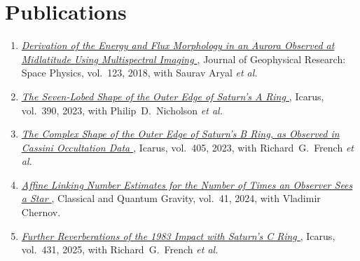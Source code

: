 \documentclass[letterpaper,sans]{moderncv}
\begin{document}
    \section{Publications}
        \begin{enumerate}\raggedright
            \item
                \textit{%
                    \href{https://doi.org/10.1029/2018JA025229}{%
                        Derivation of the Energy and Flux Morphology in an
                        Aurora Observed at Midlatitude Using Multispectral
                        Imaging%
                    }%
                },
                Journal of Geophysical Research: Space Physics,
                vol.~123, 2018, with Saurav Aryal \textit{et al.}
            \item
                \textit{%
                    \href{https://doi.org/10.1016/j.icarus.2022.115287}{%
                        The Seven-Lobed Shape of the Outer
                        Edge of Saturn's A Ring%
                    }%
                },
                Icarus, vol.~390, 2023, with Philip~D.~Nicholson
                \textit{et al.}
            \item
                \textit{%
                    \href{https://doi.org/10.1016/j.icarus.2023.115678}{%
                        The Complex Shape of the Outer Edge of Saturn's
                        B Ring, as Observed in Cassini Occultation Data%
                    }%
                },
                Icarus, vol.~405, 2023, with Richard~G.~French
                \textit{et al.}
            \item
                \textit{%
                    \href{https://doi.org/10.1088/1361-6382/ad2e41}{%
                        Affine Linking Number Estimates for the Number of
                        Times an Observer Sees a Star%
                    }%
                },
                Classical and Quantum Gravity, vol.~41, 2024,
                with Vladimir Chernov.
            \item
                \textit{%
                    \href{https://doi.org/10.1016/j.icarus.2025.116463}{%
                        Further Reverberations of the 1983
                        Impact with Saturn's C Ring%
                    }%
                },
                Icarus, vol.~431, 2025, with Richard~G.~French
                \textit{et al.}
        \end{enumerate}
\end{document}
